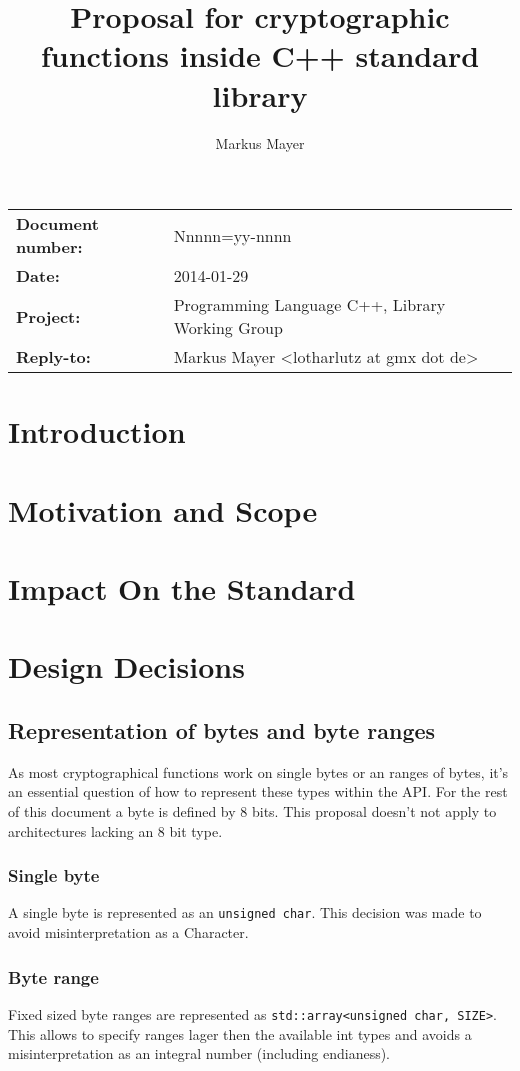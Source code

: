 \documentclass[10pt,letterpaper]{article}
\title{Proposal for cryptographic functions inside C++ standard library}
\author{Markus Mayer}
\begin{document}
\maketitle
\begin{center}
\begin{tabular}[b]{ll}
\textbf{Document number:} & Nnnnn=yy-nnnn \\ 
\textbf{Date:} & 2014-01-29 \\ 
\textbf{Project:} & Programming Language C++, Library Working Group \\ 
\textbf{Reply-to:} & Markus Mayer <lotharlutz at gmx dot de> \\ 
\end{tabular} 
\end{center}
\pagebreak
\tableofcontents
\pagebreak
\section{Introduction}
\section{Motivation and Scope}
\section{Impact On the Standard}
\section{Design Decisions}
\subsection{Representation of bytes and byte ranges}
As most cryptographical functions work on single bytes or an ranges of bytes, it's an essential question of how to represent these types within the API. For the rest of this document a byte is defined by 8 bits. This proposal doesn't not apply to architectures lacking an 8 bit type. 
\subsubsection*{Single byte}
A single byte is represented as an \texttt{unsigned char}. This decision was made to avoid misinterpretation as a Character.

\subsubsection*{Byte range}
Fixed sized byte ranges are represented as \texttt{std::array<unsigned char, SIZE>}. This allows to specify ranges lager then the available int types and avoids a misinterpretation as an integral number (including endianess).
\end{document}
